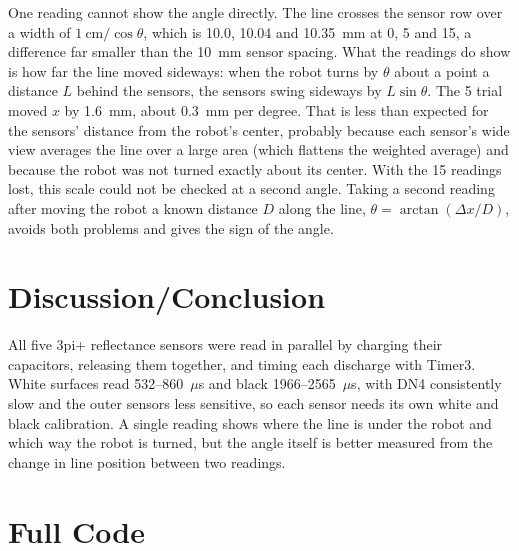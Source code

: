 \documentclass[11pt]{article}
\begin{document}
One reading cannot show the angle directly. The line crosses the sensor row over a width of $1~\text{cm} / \cos\theta$, which is 10.0, 10.04 and 10.35~mm at 0\textdegree, 5\textdegree{} and 15\textdegree, a difference far smaller than the 10~mm sensor spacing. What the readings do show is how far the line moved sideways: when the robot turns by $\theta$ about a point a distance $L$ behind the sensors, the sensors swing sideways by $L \sin\theta$. The 5\textdegree{} trial moved $x$ by 1.6~mm, about 0.3~mm per degree. That is less than expected for the sensors' distance from the robot's center, probably because each sensor's wide view averages the line over a large area (which flattens the weighted average) and because the robot was not turned exactly about its center. With the 15\textdegree{} readings lost, this scale could not be checked at a second angle. Taking a second reading after moving the robot a known distance $D$ along the line, $\theta = \arctan(\Delta x / D)$, avoids both problems and gives the sign of the angle.

\section{Discussion/Conclusion}
All five 3pi+ reflectance sensors were read in parallel by charging their capacitors, releasing them together, and timing each discharge with Timer3. White surfaces read 532--860~$\mu$s and black 1966--2565~$\mu$s, with DN4 consistently slow and the outer sensors less sensitive, so each sensor needs its own white and black calibration. A single reading shows where the line is under the robot and which way the robot is turned, but the angle itself is better measured from the change in line position between two readings.

\pagebreak

\appendix
\section{Full Code}
\label{app:code}




\end{document}
